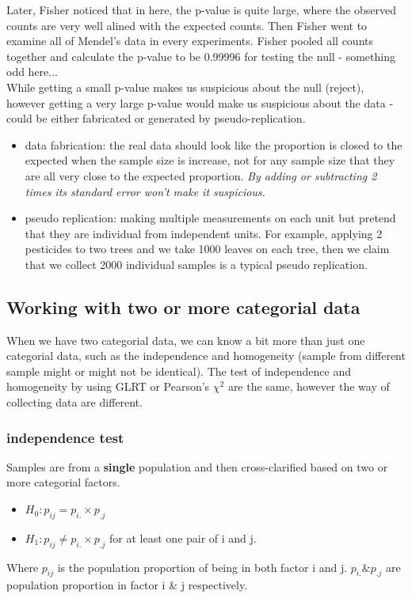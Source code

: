 \documentclass[12pt ]{article}
\begin{document}
Later, Fisher noticed that in here, the p-value is quite large, where the observed counts are very well alined with the expected counts. Then Fisher went to examine all of Mendel's data in every experiments. Fisher pooled all counts together and calculate the p-value to be 0.99996 for testing the null - something odd here... \\

While getting a small p-value makes us suspicious about the null (reject), however getting a very large p-value would make us suspicious about the data - could be either fabricated or generated by pseudo-replication.
\begin{itemize}
\item data fabrication: the real data should look like the proportion is closed to the expected when the sample size is increase, not for any sample size that they are all very close to the expected proportion. \textit{By adding or subtracting 2 times its standard error won't make it suspicious.}
\item pseudo replication: making multiple measurements on each unit but pretend that they are individual from independent units. For example, applying 2 pesticides to two trees and we take 1000 leaves on each tree, then we claim that we collect 2000 individual samples is a typical pseudo replication.
\end{itemize}

\subsection{Working with two or more categorial data}
When we have two categorial data, we can know a bit more than just one categorial data, such as the independence and homogeneity (sample from different sample might or might not be identical). The test of independence and homogeneity by using GLRT or  Pearson's $\chi^2$ are the same, however the way of collecting data are different. \\

\subsubsection{independence test}
Samples are from a \textbf{single} population and then cross-clarified based on two or more categorial factors. 
\begin{itemize}
\item $H_{0}: p_{ij} = p_{i.} \times p_{.j}$
\item $H_{1}: p_{ij} \neq p_{i.} \times p_{.j}$ for at least one pair of i and j.
\end{itemize}
Where $p_{ij}$ is the population proportion of being in both factor i and j. $p_{i.} \& p_{.j}$ are population proportion in factor i \& j respectively. \\
\end{document}
